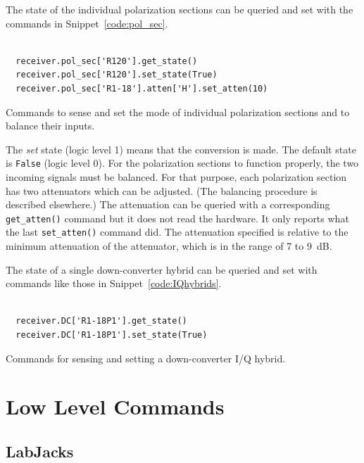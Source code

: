 \documentclass[letterpaper,11pt]{book}
\begin{document}
The state of the individual polarization sections can be queried and set with
the commands in Snippet~\ref{code:pol_sec}.
\begin{code}[h!tb]
\begin{center}
\begin{verbatim}

  receiver.pol_sec['R120'].get_state()
  receiver.pol_sec['R120'].set_state(True)
  receiver.pol_sec['R1-18'].atten['H'].set_atten(10)\end{verbatim}
  \caption[Control of individual polarization sections]
  {\label{code:pol_sec}Commands
  to sense and set the mode of individual
  polarization sections and to balance their inputs.}
\end{center}
\end{code}  
The {\it set} state (logic level 1) means that the conversion is made.  The
default state is {\tt False} (logic level 0).
For the polarization sections to function properly, the two incoming signals
must be balanced.  For that purpose, each polarization section has two
attenuators which can be adjusted.  (The balancing procedure is described
elsewhere.) 
The attenuation can be queried with a corresponding {\tt get\_atten()}
command but it does not read the hardware.  It only reports what the last
{\tt set\_atten()} command did.  The attenuation specified is relative to
the minimum attenuation of the attenuator, which is in the range of 7 to 9~dB.

The state of a single down-converter hybrid can be queried and set
with commands like those in Snippet~\ref{code:IQhybrids}.
\begin{code}[h!tb]
\begin{center}
\begin{verbatim}

  receiver.DC['R1-18P1'].get_state()
  receiver.DC['R1-18P1'].set_state(True)\end{verbatim}
\caption{\label{code:IQhybrids}Commands for sensing and setting a 
down-converter I/Q hybrid.}
\end{center}
\end{code}



\section{Low Level Commands}

\subsection{LabJacks}
\end{document}

